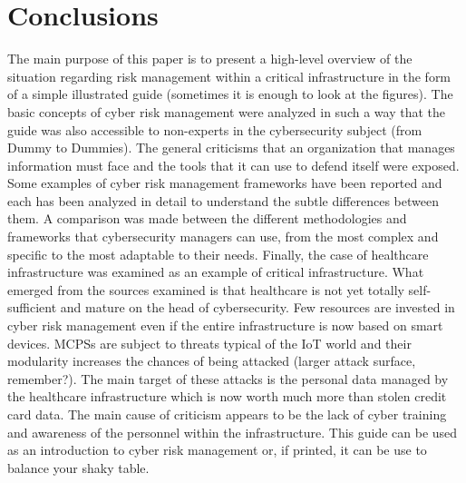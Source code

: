 \chapter{Conclusions}
The main purpose of this paper is to present a high-level overview of the situation regarding risk management within a critical infrastructure in the form of a simple illustrated guide (sometimes it is enough to look at the figures). The basic concepts of cyber risk management were analyzed in such a way that the guide was also accessible to non-experts in the cybersecurity subject (from Dummy to Dummies). The general criticisms that an organization that manages information must face and the tools that it can use to defend itself were exposed. Some examples of cyber risk management frameworks have been reported and each has been analyzed in detail to understand the subtle differences between them. A comparison was made between the different methodologies and frameworks that cybersecurity managers can use, from the most complex and specific to the most adaptable to their needs. Finally, the case of healthcare infrastructure was examined as an example of critical infrastructure. What emerged from the sources examined is that healthcare is not yet totally self-sufficient and mature on the head of cybersecurity. Few resources are invested in cyber risk management even if the entire infrastructure is now based on smart devices. MCPSs are subject to threats typical of the IoT world and their modularity increases the chances of being attacked (larger attack surface, remember?).
The main target of these attacks is the personal data managed by the healthcare infrastructure which is now worth much more than stolen credit card data.
The main cause of criticism appears to be the lack of cyber training and awareness of the personnel within the infrastructure. This guide can be used as an introduction to cyber risk management or, if printed, it can be use to balance your shaky table.